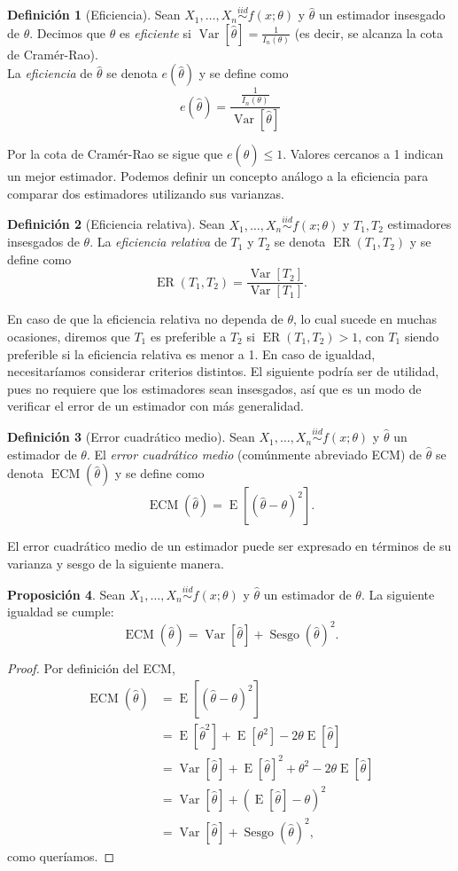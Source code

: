 \documentclass[11pt,letterpaper]{article}
\newcommand{\expected}{\ensuremath{\operatorname{E}}}
\newcommand{\variance}{\ensuremath{\operatorname{Var}}}
\newcommand{\MSE}{\ensuremath{\operatorname{ECM}}}
\newcommand{\bias}{\ensuremath{\operatorname{Sesgo}}}
\newcommand{\RE}{\ensuremath{\operatorname{ER}}}
\theoremstyle{definition}
\newtheorem{definition}{Definición}[section]
\theoremstyle{theorem}
\newtheorem{proposition}[definition]{Proposición}
\theoremstyle{remark}
\begin{document}
	\begin{definition}[Eficiencia]
		Sean \(X_1,\dots,X_n\overset{iid}{\sim}f(x;\theta)\) y \(\hat{\theta}\) un estimador insesgado de \(\theta\). Decimos que \(\hat{\theta}\) es \textit{eficiente} si \(\variance[\hat{\theta}]=\frac{1}{I_n(\theta)}\) (es decir, se alcanza la cota de Cramér-Rao). \\
		La \textit{eficiencia} de \(\hat{\theta}\) se denota \(e(\hat{\theta})\) y se define como \[e(\hat{\theta})=\frac{\frac{1}{I_n(\theta)}}{\variance[\hat{\theta}]}\]
	\end{definition}
	Por la cota de Cramér-Rao se sigue que \(e(\hat{\theta})\leq1\). Valores cercanos a 1 indican un mejor estimador. Podemos definir un concepto análogo a la eficiencia para comparar dos estimadores utilizando sus varianzas.
	\begin{definition}[Eficiencia relativa]
		Sean \(X_1,\dots,X_n\overset{iid}{\sim}f(x;\theta)\) y \(T_1,T_2\) estimadores insesgados de \(\theta\). La \textit{eficiencia relativa} de \(T_1\) y \(T_2\) se denota \(\RE(T_1,T_2)\) y se define como \[\RE(T_1,T_2)= \frac{\variance[T_2]}{\variance[T_1]}.\]
	\end{definition}
	En caso de que la eficiencia relativa no dependa de \(\theta\), lo cual sucede en muchas ocasiones, diremos que \(T_1\) es preferible a \(T_2\) si \(\RE(T_1,T_2)>1\), con \(T_1\) siendo preferible si la eficiencia relativa es menor a 1. En caso de igualdad, necesitaríamos considerar criterios distintos. El siguiente podría ser de utilidad, pues no requiere que los estimadores sean insesgados, así que es un modo de verificar el error de un estimador con más generalidad.
	\begin{definition}[Error cuadrático medio]
		Sean \(X_1,\dots,X_n\overset{iid}{\sim}f(x;\theta)\) y \(\hat{\theta}\) un estimador de \(\theta\). El \textit{error cuadrático medio} (comúnmente abreviado ECM) de \(\hat{\theta}\) se denota \(\MSE(\hat{\theta})\) y se define como \[\MSE(\hat{\theta})=\expected\left[(\hat{\theta}-\theta)^2\right].\]
	\end{definition}
	El error cuadrático medio de un estimador puede ser expresado en términos de su varianza y sesgo de la siguiente manera.
	\begin{proposition}
		Sean \(X_1,\dots,X_n\overset{iid}{\sim}f(x;\theta)\) y \(\hat{\theta}\) un estimador de \(\theta\). La siguiente igualdad se cumple: \[\MSE(\hat{\theta})=\variance[\hat{\theta}]+\bias(\hat{\theta})^2.\]
	\end{proposition}
	\begin{proof}
		Por definición del ECM,
		\begin{align*}
			\MSE(\hat{\theta})&=\expected\left[(\hat{\theta}-\theta)^2\right] \\
			&=\expected[\hat{\theta}^2]+\expected[\theta^2]-2\theta\expected[\hat{\theta}] \\
			&=\variance[\hat{\theta}]+\expected[\hat{\theta}]^2+\theta^2-2\theta\expected[\hat{\theta}] \\
			&=\variance[\hat{\theta}]+(\expected[\hat{\theta}]-\theta)^2 \\
			&=\variance[\hat{\theta}]+\bias(\hat{\theta})^2,
		\end{align*}
		como queríamos.
	\end{proof}
\end{document}
